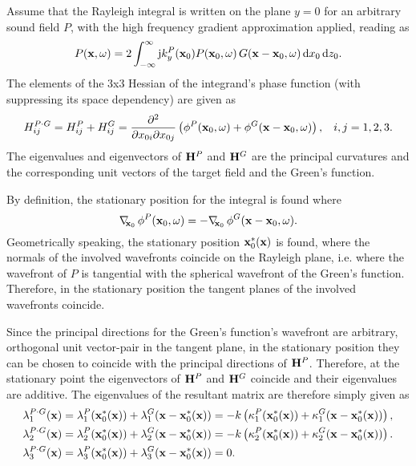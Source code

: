 Assume that the Rayleigh integral is written on the plane $y = 0$ for an arbitrary sound field $P$, with the high frequency gradient approximation applied, reading as
\begin{equation}
P(\mathbf{x},\omega) = 2 \int_{-\infty}^{\infty} \mathrm{j} k_y^P(\mathbf{x}_0) P(\mathbf{x}_0, \omega) \, G(\mathbf{x}-\mathbf{x}_0,\omega) \, \mathrm{d} x_0 \, \mathrm{d} z_0.
\end{equation}
The elements of the 3x3 Hessian of the integrand's phase function (with suppressing its space dependency) are given as
\begin{equation}
\label{eq:app:Hessian_for_Rayleigh}
H_{ij}^{P \cdot G} = H_{ij}^P + H_{ij}^G = \frac{\partial^2}{\partial x_{0 i} \partial x_{0 j}}\left( \phi^P(\mathbf{x}_0,\omega) + \phi^G(\mathbf{x}-\mathbf{x}_0,\omega) \right), \hspace{3mm} i,j = 1,2,3.
\end{equation}
The eigenvalues and eigenvectors of $\mathbf{H}^P$ and $\mathbf{H}^G$ are the principal curvatures and the corresponding unit vectors of the target field and the Green's function.

By definition, the stationary position for the integral is found where
\begin{equation}
\label{eq:app:Rayleigh_stat_point}
\Dxo \phi^P(\vxo,\omega) = -\Dxo \phi^G(\vx-\vxo,\omega).  %
\end{equation}
Geometrically speaking, the stationary position $\mathbf{x}_0^*(\mathbf{x})$ is found, where the normals of the involved wavefronts coincide on the Rayleigh plane, i.e. where the wavefront of $P$ is tangential with the spherical wavefront of the Green's function.
Therefore, in the stationary position the tangent planes of the involved wavefronts coincide. 

Since the principal directions for the Green's function's wavefront are arbitrary, orthogonal unit vector-pair in the tangent plane, in the stationary position they can be chosen to coincide with the principal directions of $\mathbf{H}^P$.
Therefore, at the stationary point the eigenvectors of $\mathbf{H}^P$ and $\mathbf{H}^G$ coincide and their eigenvalues are additive.
The eigenvalues of the resultant matrix are therefore simply given as
\begin{align}
\label{eq:app:propagated_curvature}
\lambda^{P \cdot G}_1(\mathbf{x}) &= \lambda_1^P(\mathbf{x}_0^*(\mathbf{x})) + \lambda_1^G(\mathbf{x}-\mathbf{x}_0^*(\mathbf{x})) = -k \left( \kappa_1^P(\mathbf{x}_0^*(\mathbf{x})) + \kappa_1^G(\mathbf{x}-\mathbf{x}_0^*(\mathbf{x})) \right), \\
\lambda^{P \cdot G}_2(\mathbf{x}) &= \lambda_2^P(\mathbf{x}_0^*(\mathbf{x})) + \lambda_2^G(\mathbf{x}-\mathbf{x}_0^*(\mathbf{x})) = -k \left( \kappa_2^P(\mathbf{x}_0^*(\mathbf{x})) + \kappa_2^G(\mathbf{x}-\mathbf{x}_0^*(\mathbf{x})) \right). \\
\lambda^{P \cdot G}_3(\mathbf{x}) &= \lambda_3^P(\mathbf{x}_0^*(\mathbf{x})) + \lambda_3^G(\mathbf{x}-\mathbf{x}_0^*(\mathbf{x})) = 0.
\end{align}

